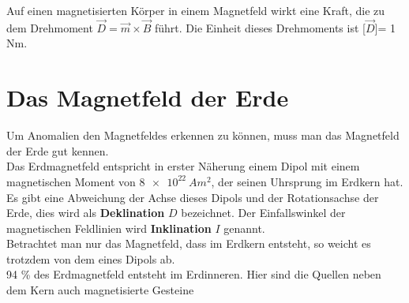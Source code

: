Auf einen magnetisierten Körper in einem Magnetfeld wirkt eine Kraft, die zu dem Drehmoment $\vec{D} = \vec{m} \times \vec{B}$ führt. Die Einheit dieses Drehmoments ist [$\vec{D}$]= 1 Nm.

\section{Das Magnetfeld der Erde}
Um Anomalien den Magnetfeldes erkennen zu können, muss man das Magnetfeld der Erde gut kennen.\\
Das Erdmagnetfeld entspricht in erster Näherung einem Dipol mit einem magnetischen Moment von $\SI{8 e22}{Am^2}$, der seinen Uhrsprung im Erdkern hat. Es gibt eine Abweichung der Achse dieses Dipols und der 
Rotationsachse der Erde, dies wird als \textbf{Deklination} $D$ bezeichnet. 
Der Einfallswinkel der magnetischen Feldlinien wird \textbf{Inklination} $I$ genannt. \\
Betrachtet man nur das Magnetfeld, dass im Erdkern entsteht, so weicht es trotzdem von dem eines Dipols ab. \\ 94 \% des Erdmagnetfeld entsteht im Erdinneren. Hier sind die Quellen neben dem Kern auch magnetisierte Gesteine 




